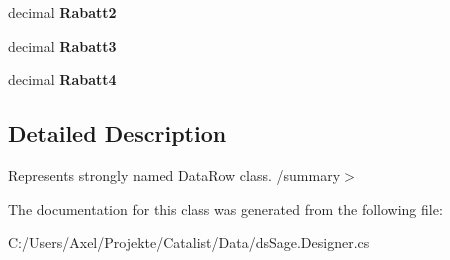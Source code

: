 \begin{DoxyCompactItemize}
\item 
decimal {\bfseries Rabatt2}\hypertarget{class_products_1_1_data_1_1ds_sage_1_1_kunden_artikel_sonderpreise_row_a2a958836b396ea683e06931402eb1f56}{}\label{class_products_1_1_data_1_1ds_sage_1_1_kunden_artikel_sonderpreise_row_a2a958836b396ea683e06931402eb1f56}

\item 
decimal {\bfseries Rabatt3}\hypertarget{class_products_1_1_data_1_1ds_sage_1_1_kunden_artikel_sonderpreise_row_a367052fea3a027f15837342ee31577ed}{}\label{class_products_1_1_data_1_1ds_sage_1_1_kunden_artikel_sonderpreise_row_a367052fea3a027f15837342ee31577ed}

\item 
decimal {\bfseries Rabatt4}\hypertarget{class_products_1_1_data_1_1ds_sage_1_1_kunden_artikel_sonderpreise_row_a290a7327c953cdf8fbb1e5be41be3667}{}\label{class_products_1_1_data_1_1ds_sage_1_1_kunden_artikel_sonderpreise_row_a290a7327c953cdf8fbb1e5be41be3667}

\end{DoxyCompactItemize}


\subsection{Detailed Description}
Represents strongly named Data\+Row class. /summary$>$ 

The documentation for this class was generated from the following file\+:\begin{DoxyCompactItemize}
\item 
C\+:/\+Users/\+Axel/\+Projekte/\+Catalist/\+Data/ds\+Sage.\+Designer.\+cs\end{DoxyCompactItemize}
